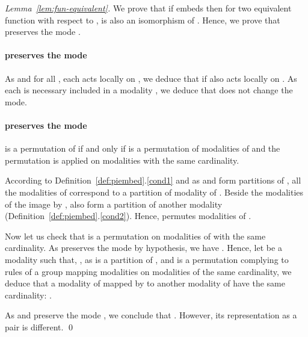 \documentclass[12pt]{elsarticle}
\begin{document}
\begin{proof}[Lemma~\ref{lem:fun-equivalent}]
We prove that if  embeds  then for two equivalent function with respect to ,  is also an isomorphism of . Hence, we prove that  preserves the mode .

\paragraph{ preserves the mode }
As  and for all , each  acts locally on , we deduce that if   also acts locally on . As each  is necessary included in a modality , we deduce that  does not change the mode. 

\paragraph{ preserves the mode }
 is a permutation of  if and only if  is a permutation of modalities of  and the permutation is applied on modalities with the same cardinality.

\medskip
According to Definition~\ref{def:piembed}.\ref{cond1} and as  and  form partitions of , all the modalities of  correspond to a partition of modality of . Beside the modalities of the image by ,  also form a partition of another modality (Definition~\ref{def:piembed}.\ref{cond2}). Hence,  permutes modalities of .

Now let us check that  is a permutation on modalities of  with the same cardinality.
As  preserves the mode  by hypothesis, we have . Hence, let  be a modality such that, 
, as  is a partition of ,
and  is a permutation complying to rules of a  group mapping modalities on modalities of the same cardinality, we deduce that a modality of  mapped by  to another modality of  have the same cardinality: 
. 

\medskip
As  and  preserve the mode , we conclude that . However, its representation as a pair  is different. 
\qed \end{proof}

\pagebreak

	
\end{document}
